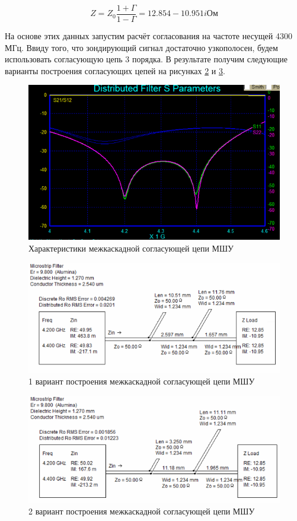\documentclass[utf8x, 14pt, oneside, a4paper]{article}
\begin{document}
				\begin{equation}
					\label{eq:Gam_amp1a}
					Z=Z_{0}\frac{1+\Gamma}{1-\Gamma}=12.854-10.951i \text{Ом}
				\end{equation}
			
				На основе этих данных запустим расчёт согласования на частоте несущей 4300 МГц. Ввиду того, что зондирующий сигнал достаточно узкополосен, будем использовать согласующую цепь 3 порядка. В результате получим следующие варианты построения согласующих цепей на рисунках \ref{fig:match1a} и \ref{fig:match1b}. 
				
				\begin{figure}[H]
					\centering
					\includegraphics[width=0.7\linewidth]{"Рисунки/Графики/Согласование межкаскадное"}
					\caption{{Характеристики межкаскадной согласующей цепи МШУ}}
					\label{fig:graf:match1}
				\end{figure}
				
				\begin{figure}[H]
					\centering
					\includegraphics[width=0.7\linewidth]{"Рисунки/Схемы/Согласование межкаскадное А"}
					\caption{1 вариант построения межкаскадной согласующей цепи МШУ}
					\label{fig:match1a}
				\end{figure}
				
				\begin{figure}[H]
					\centering
					\includegraphics[width=0.7\linewidth]{"Рисунки/Схемы/Согласование межкаскадное Б"}
					\caption{2 вариант построения межкаскадной согласующей цепи МШУ}
					\label{fig:match1b}
				\end{figure}
				
\end{document}
